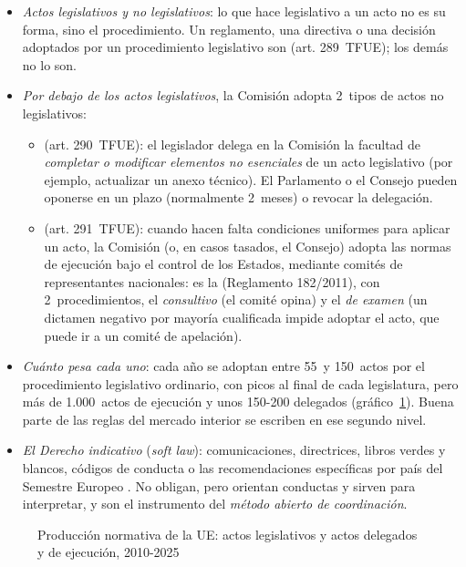 \documentclass[11pt]{article}
\begin{document}
\begin{itemize}
\item \emph{Actos legislativos y no legislativos}: lo que hace legislativo a un acto no es su forma, sino el procedimiento. Un reglamento, una directiva o una decisión adoptados por un procedimiento legislativo son  (art. 289~TFUE); los demás no lo son.
\item \emph{Por debajo de los actos legislativos}, la Comisión adopta 2~tipos de actos no legislativos:
  \begin{itemize}
  \item {} (art. 290~TFUE): el legislador delega en la Comisión la facultad de \emph{completar o modificar elementos no esenciales} de un acto legislativo (por ejemplo, actualizar un anexo técnico). El Parlamento o el Consejo pueden oponerse en un plazo (normalmente 2~meses) o revocar la delegación.
  \item {} (art. 291~TFUE): cuando hacen falta condiciones uniformes para aplicar un acto, la Comisión (o, en casos tasados, el Consejo) adopta las normas de ejecución bajo el control de los Estados, mediante comités de representantes nacionales: es la  (Reglamento 182/2011), con 2~procedimientos, el \emph{consultivo} (el comité opina) y el \emph{de examen} (un dictamen negativo por mayoría cualificada impide adoptar el acto, que puede ir a un comité de apelación)\nocite{UE2011Comitologia}.
  \end{itemize}
\item \emph{Cuánto pesa cada uno}: cada año se adoptan entre 55~y 150~actos por el procedimiento legislativo ordinario, con picos al final de cada legislatura, pero más de 1.000~actos de ejecución y unos 150-200 delegados (gráfico~\ref{fig:actos}). Buena parte de las reglas del mercado interior se escriben en ese segundo nivel.
\item \emph{El Derecho indicativo} (\emph{soft law}): comunicaciones, directrices, libros verdes y blancos, códigos de conducta o las recomendaciones específicas por país del Semestre Europeo . No obligan, pero orientan conductas y sirven para interpretar, y son el instrumento del \emph{método abierto de coordinación}.
\end{itemize}

\begin{figure}[H]
\centering
\caption{Producción normativa de la UE: actos legislativos y actos delegados y de ejecución, 2010-2025}\label{fig:actos}
\end{figure}
\end{document}
